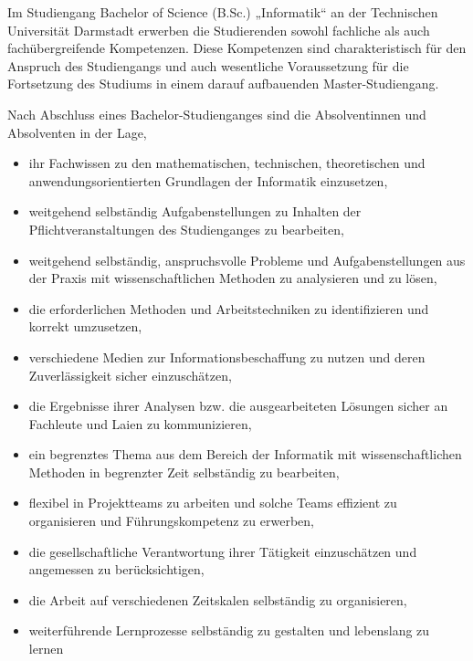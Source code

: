 {Im Studiengang Bachelor of Science (B.Sc.) „Informatik“ an der Technischen Universität Darmstadt erwerben die Studierenden sowohl fachliche als auch fachübergreifende Kompetenzen. Diese Kompetenzen sind charakteristisch für den Anspruch des Studiengangs und auch wesentliche Voraussetzung für die Fortsetzung des Studiums in einem darauf aufbauenden Master-Studiengang.

Nach Abschluss eines Bachelor-Studienganges sind die Absolventinnen und Absolventen in der Lage,
\begin{itemize}
\item{ihr Fachwissen zu den mathematischen, technischen, theoretischen und anwendungsorientierten Grundlagen der Informatik einzusetzen,}
\item{weitgehend selbständig Aufgabenstellungen zu Inhalten der Pflichtveranstaltungen des Studienganges zu bearbeiten,}
\item{weitgehend selbständig, anspruchsvolle Probleme und Aufgabenstellungen aus der Praxis mit wissenschaftlichen Methoden zu analysieren und zu lösen,}
\item{die erforderlichen Methoden und Arbeitstechniken zu identifizieren und korrekt umzusetzen,}
\item{verschiedene Medien zur Informationsbeschaffung zu nutzen und deren Zuverlässigkeit sicher einzuschätzen,}
\item{die Ergebnisse ihrer Analysen bzw. die ausgearbeiteten Lösungen sicher an Fachleute und Laien zu kommunizieren,}
\item{ein begrenztes Thema aus dem Bereich der Informatik mit wissenschaftlichen Methoden in begrenzter Zeit selbständig zu bearbeiten,}
\item{flexibel in Projektteams zu arbeiten und solche Teams effizient zu organisieren und Führungskompetenz zu erwerben,}
\item{die gesellschaftliche Verantwortung ihrer Tätigkeit einzuschätzen und angemessen zu berücksichtigen,}
\item{die Arbeit auf verschiedenen Zeitskalen selbständig zu organisieren,}
\item{weiterführende Lernprozesse selbständig zu gestalten und lebenslang zu lernen}
\end{itemize}
}{}

\newpage
